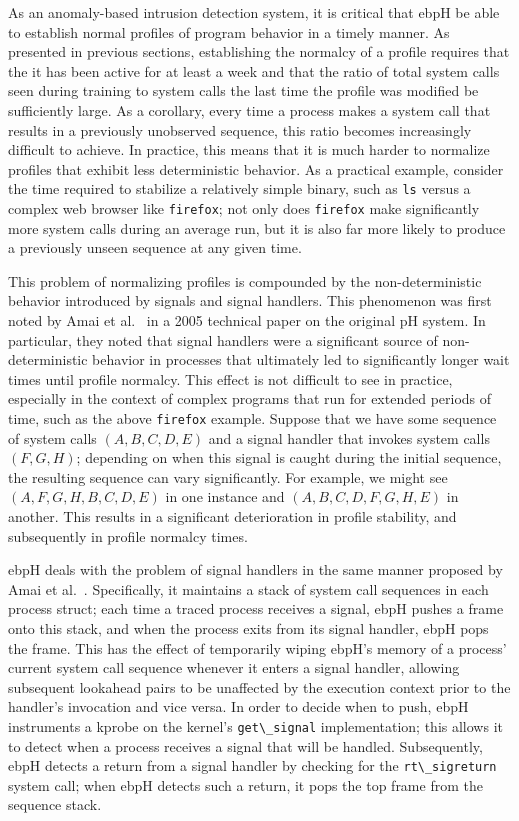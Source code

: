 \documentclass[
  12pt]{findlay}
\newcommand{\passthrough}[1]{#1}
\begin{document}
As an anomaly-based intrusion detection system, it is critical that ebpH
be able to establish normal profiles of program behavior in a timely
manner. As presented in previous sections, establishing the normalcy of
a profile requires that the it has been active for at least a week and
that the ratio of total system calls seen during training to system
calls the last time the profile was modified be sufficiently large. As a
corollary, every time a process makes a system call that results in a
previously unobserved sequence, this ratio becomes increasingly
difficult to achieve. In practice, this means that it is much harder to
normalize profiles that exhibit less deterministic behavior. As a
practical example, consider the time required to stabilize a relatively
simple binary, such as \passthrough{\lstinline!ls!} versus a complex web
browser like \passthrough{\lstinline!firefox!}; not only does
\passthrough{\lstinline!firefox!} make significantly more system calls
during an average run, but it is also far more likely to produce a
previously unseen sequence at any given time.

This problem of normalizing profiles is compounded by the
non-deterministic behavior introduced by signals and signal handlers.
This phenomenon was first noted by Amai et al.~\autocite{amai05} in a
2005 technical paper on the original pH system. In particular, they
noted that signal handlers were a significant source of
non-deterministic behavior in processes that ultimately led to
significantly longer wait times until profile normalcy. This effect is
not difficult to see in practice, especially in the context of complex
programs that run for extended periods of time, such as the above
\passthrough{\lstinline!firefox!} example. Suppose that we have some
sequence of system calls \((A, B, C, D, E)\) and a signal handler that
invokes system calls \((F, G, H)\); depending on when this signal is
caught during the initial sequence, the resulting sequence can vary
significantly. For example, we might see \((A, F, G, H, B, C, D, E)\) in
one instance and \((A, B, C, D, F, G, H, E)\) in another. This results
in a significant deterioration in profile stability, and subsequently in
profile normalcy times.

ebpH deals with the problem of signal handlers in the same manner
proposed by Amai et al.~\autocite{amai05}. Specifically, it maintains a
stack of system call sequences in each process struct; each time a
traced process receives a signal, ebpH pushes a frame onto this stack,
and when the process exits from its signal handler, ebpH pops the frame.
This has the effect of temporarily wiping ebpH's memory of a process'
current system call sequence whenever it enters a signal handler,
allowing subsequent lookahead pairs to be unaffected by the execution
context prior to the handler's invocation and vice versa. In order to
decide when to push, ebpH instruments a kprobe on the kernel's
\passthrough{\lstinline!get\_signal!} implementation; this allows it to
detect when a process receives a signal that will be handled.
Subsequently, ebpH detects a return from a signal handler by checking
for the \passthrough{\lstinline!rt\_sigreturn!} system call; when ebpH
detects such a return, it pops the top frame from the sequence stack.
\end{document}
